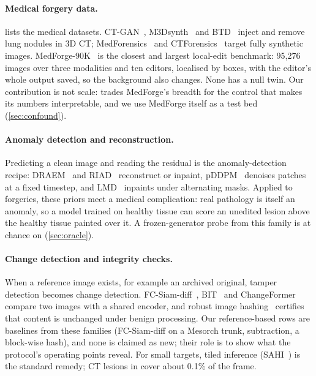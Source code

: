 \paragraph{Medical forgery data.}
 lists the medical datasets.
CT-GAN~\cite{mirsky2019ctgan}, M3Dsynth~\cite{zingarini2024m3dsynth} and BTD~\cite{grabovski2025btd} inject and remove lung nodules in 3D CT; MedForensics~\cite{li2025medforensics} and CTForensics~\cite{ctforensics2026} target fully synthetic images.
MedForge-90K~\cite{chen2026medforge} is the closest and largest local-edit benchmark: 95,276 images over three modalities and ten editors, %
localised by boxes, with the editor's whole output saved, so the background also changes. %
None has a null twin.
Our contribution is not scale: \dataset trades MedForge's breadth for the control that makes its numbers interpretable, and we use MedForge itself as a test bed (\cref{sec:confound}).

\paragraph{Anomaly detection and reconstruction.}
Predicting a clean image and reading the residual is the anomaly-detection recipe: DRAEM~\cite{zavrtanik2021draem} and RIAD~\cite{zavrtanik2021riad} reconstruct or inpaint, pDDPM~\cite{behrendt2024pddpm} denoises patches at a fixed timestep, and LMD~\cite{liu2023lmd} inpaints under alternating masks.
Applied to forgeries, these priors meet a medical complication: real pathology is itself an anomaly, so a model trained on healthy tissue can score an unedited lesion above the healthy tissue painted over it.
A frozen-generator probe from this family is at chance on \dataset (\cref{sec:oracle}).

\paragraph{Change detection and integrity checks.}
When a reference image exists, for example an archived original, tamper detection becomes change detection.
FC-Siam-diff~\cite{daudt2018fcsiam}, BIT~\cite{chen2022bit} and ChangeFormer~\cite{bandara2022changeformer} compare two images with a shared encoder, and robust image hashing~\cite{venkatesan2000hash,swaminathan2006hash} certifies that content is unchanged under benign processing.
Our reference-based rows are baselines from these families (FC-Siam-diff on a Mesorch trunk, subtraction, a block-wise hash), and none is claimed as new; their role is to show what the protocol's operating points reveal.
For small targets, tiled inference (SAHI~\cite{akyon2022sahi}) is the standard remedy; CT lesions in \dataset cover about 0.1\% of the frame. %
